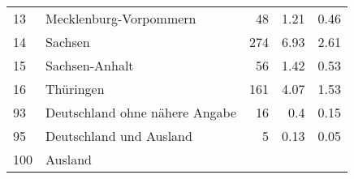 \begin{longtable}{lXrrr}
     13 &
     \multicolumn{1}{X}{ Mecklenburg-Vorpommern   } &


       \num{48} &
       \num[round-mode=places,round-precision=2]{1,21} &
         \num[round-mode=places,round-precision=2]{0,46} \\

     14 &
     \multicolumn{1}{X}{ Sachsen   } &


       \num{274} &
       \num[round-mode=places,round-precision=2]{6,93} &
         \num[round-mode=places,round-precision=2]{2,61} \\

     15 &
     \multicolumn{1}{X}{ Sachsen-Anhalt   } &


       \num{56} &
       \num[round-mode=places,round-precision=2]{1,42} &
         \num[round-mode=places,round-precision=2]{0,53} \\

     16 &
     \multicolumn{1}{X}{ Thüringen   } &


       \num{161} &
       \num[round-mode=places,round-precision=2]{4,07} &
         \num[round-mode=places,round-precision=2]{1,53} \\

     93 &
     \multicolumn{1}{X}{ Deutschland ohne nähere Angabe   } &


       \num{16} &
       \num[round-mode=places,round-precision=2]{0,4} &
         \num[round-mode=places,round-precision=2]{0,15} \\

     95 &
     \multicolumn{1}{X}{ Deutschland und Ausland   } &


       \num{5} &
       \num[round-mode=places,round-precision=2]{0,13} &
         \num[round-mode=places,round-precision=2]{0,05} \\

     100 &
     \multicolumn{1}{X}{ Ausland   } &



\end{longtable}

